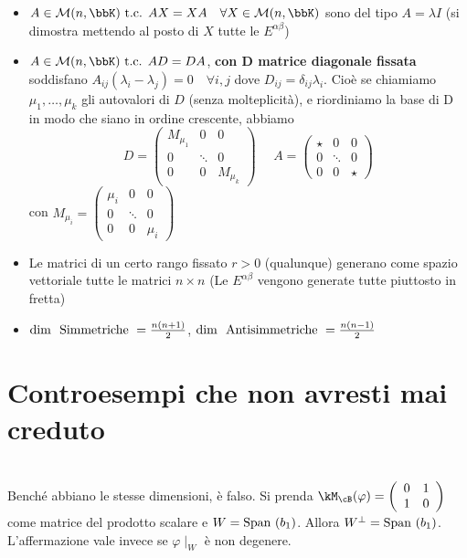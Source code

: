 \documentclass[a4paper,NoNotes,GeneralMath]{stdmdoc}
\begin{document}
\begin{itemize}
		\item $A \in \mathcal{M}(n, \bbK) \tc AX = XA \quad \forall X \in \mathcal{M}(n, \bbK)$ sono del tipo $A = \lambda I$ (si dimostra mettendo al posto di $X$ tutte le $E^{\alpha\beta}$)
		\item $A \in \mathcal{M}(n, \bbK) \tc AD = DA$, {\bf con $\bm D$ matrice diagonale fissata} soddisfano $A_{ij}(\lambda_i - \lambda_j) = 0 \quad \forall i,j$ dove $D_{ij} = \delta_{ij}\lambda_i$. Cioè se chiamiamo $\mu_1, \ldots, \mu_k$ gli autovalori di $D$ (senza molteplicità), e riordiniamo la base di D in modo che siano in ordine crescente, abbiamo $$D = \left(\begin{array}{c|c|c} M_{\mu_1} & 0 & 0 \\ \hline 0 & \ddots & 0 \\ \hline 0 & 0 & M_{\mu_k} \end{array}\right) \ \ \ \ \ \ A = \left(\begin{array}{c|c|c} \star & 0 & 0 \\ \hline 0 & \ddots & 0 \\ \hline 0 & 0 & \star \end{array}\right) $$ con $M_{\mu_i} = \left(\begin{array}{ccc} \mu_i & 0 & 0 \\ 0 & \ddots & 0 \\ 0 & 0 & \mu_i \end{array}\right)$
		\item Le matrici di un certo rango fissato $r > 0$ (qualunque) generano come spazio vettoriale tutte le matrici $n\times n$ (Le $E^{\alpha\beta}$ vengono generate tutte piuttosto in fretta)
		\item $\mbox{dim } \mbox{ Simmetriche } = \frac{n(n+1)}{2}$, $\mbox{dim } \mbox{ Antisimmetriche } = \frac{n(n-1)}{2}$
	\end{itemize}

	\section*{Controesempi che non avresti mai creduto}
	 \\
	Benché abbiano le stesse dimensioni, è falso. Si prenda $\kM_{\cB}(\varphi) = \left( \begin{array}{cc} 0 & 1 \\ 1 & 0 \end{array} \right)$ come matrice del prodotto scalare e $W = \mbox{Span }(b_1)$. Allora $W^\bot = \mbox{Span }(b_1)$. \\ L'affermazione vale invece se $\varphi\mid_W$ è non degenere.

	\Altro{}
	
\end{document}
